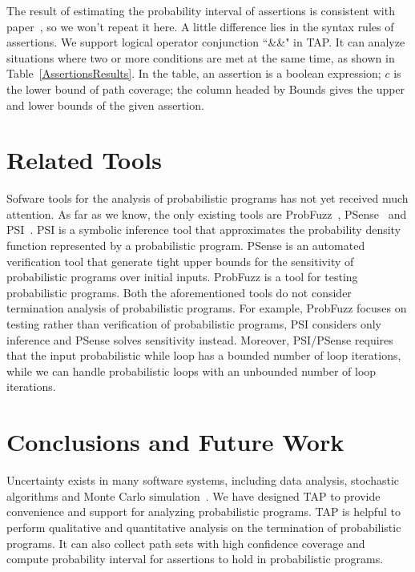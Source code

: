 \documentclass[sigconf,review, anonymous]{acmart}
\begin{document}
The result of estimating the probability interval of assertions is consistent with paper~\cite{Sankaranarayanan2013Static}, so we won't repeat it here. A little difference lies in the syntax rules of assertions. We support logical operator conjunction ``\&\&" in TAP. It can analyze situations where two or more conditions are met at the same time, as shown in Table~\ref{AssertionsResults}. In the table, an assertion is a boolean expression; $c$ is the lower bound of path coverage; the column headed by Bounds gives the upper and lower bounds of the given assertion.%

\section{Related Tools}
Sofware tools for the analysis of probabilistic programs has not yet received much attention. 
As far as we know, the only existing tools are ProbFuzz~\cite{DBLP:conf/sigsoft/DuttaLHM18}, PSense~\cite{DBLP:conf/atva/HuangWM18} and PSI~\cite{DBLP:conf/cav/GehrMV16}.
PSI is a symbolic inference tool that approximates the probability density function represented by a probabilistic program. 
PSense is an automated verification tool that generate tight upper bounds for the sensitivity of probabilistic programs over initial inputs.
ProbFuzz is a tool for testing probabilistic programs. 
Both the aforementioned tools do not consider termination analysis of probabilistic programs. 
For example, ProbFuzz focuses on testing rather than verification of probabilistic programs, 
PSI considers only inference and PSense solves sensitivity instead. 
Moreover, PSI/PSense requires that the input probabilistic while loop has a bounded number of loop iterations, while we can handle probabilistic loops with an unbounded number of loop iterations.

\section{Conclusions and Future Work}
Uncertainty exists in many software systems, including data analysis, stochastic algorithms and Monte Carlo simulation~\cite{HASTINGS1970Monte}. We have designed TAP  to provide convenience and support for analyzing probabilistic programs.
TAP is helpful to perform qualitative and quantitative analysis on the termination of probabilistic programs. It can also collect path sets with high confidence coverage and compute  probability interval for assertions to hold in probabilistic programs.
\end{document}
